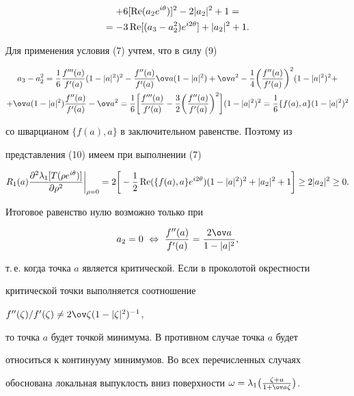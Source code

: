 \begin{pf}
\begin{multline*}
+6[\re(a_2e^{i\theta})]^2-2|a_2|^2+1 = \\ 


% 


=-3\re[(a_3-a^2_2)e^{i2\theta}]+|a_2|^2+1. 


\end{multline*} 


Для применения условия (7) учтем, что в силу (9) 


\begin{multline} 


a_3-a^2_2=\frac{1}{6}\frac{f'''(a)}{f'(a)}(1-|a|^2)^2- 


\frac{f''(a)}{f'(a)}\ov a(1-|a|^2)+\ov a^2-\frac{1}{4} 


\bigg(\frac{f''(a)}{f'(a)} \bigg)^2(1-|a|^2)^2+ \\ 


% 


+\ov a(1-|a|^2)\frac{f''(a)}{f'(a)}-\ov a^2=\frac{1}{6} 


\bigg[\frac{f'''(a)}{f'(a)}-\frac{3}{2} 


\bigg(\frac{f''(a)}{f'(a)} \bigg)^2\bigg](1-|a|^2)^2= 


\frac{1}{6}\{f(a),a\}(1-|a|^2)^2 


\end{multline} 


со шварцианом $\{f(a),a\}$ в заключительном равенстве. Поэтому из 


представления (10) имеем при выполнении (7) 


$$ 


R_1(a)\frac{\partial^2\lambda_1[T(\rho e^{i\theta})]} 


{\partial\rho^2}\bigg|_{\rho=0}=2\bigg[-\frac{1}{2}\re 


(\{f(a),a\}e^{i2\theta})(1-|a|^2)^2+|a_2|^2+1\bigg] 


\ge 2|a_2|^2\ge0. 


$$ 


Итоговое равенство нулю возможно только при 


$$ 


a_2=0\ \Leftrightarrow \ \frac{f''(a)}{f'(a)}= 


\frac{2\ov a}{1-|a|^2}, 


$$ 


т.\,е. когда точка $a$ является критической. Если в проколотой окрестности 


критической точки выполняется соотношение 


$f''(\zeta)/f'(\zeta)\ne2\ov\zeta(1-|\zeta|^2)^{-1}$, 


то точка $a$ будет точкой минимума. В противном случае точка $a$ будет 


относиться к континууму минимумов. Во всех перечисленных случаях 


обоснована локальная выпуклость вниз поверхности $\omega=\lambda_1\big( 


\frac{\zeta+a}{1+\ov a\zeta}\big)$. 


\end{pf} 


